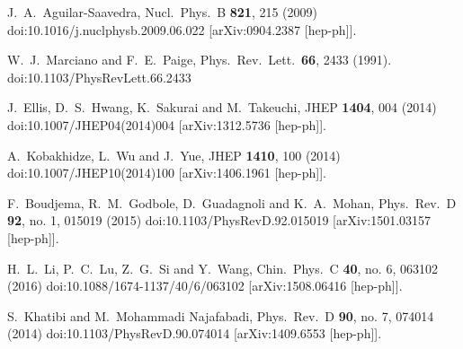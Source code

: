 \documentclass[twocolumn,prd,noshowpacs,nofootinbib,amsmath,amssymb,superscriptaddress,preprintnumbers]{revtex4}
\begin{document}
\begin{thebibliography}{99}
  J.~A.~Aguilar-Saavedra,
  Nucl.\ Phys.\ B {\bf 821}, 215 (2009)
  doi:10.1016/j.nuclphysb.2009.06.022
  [arXiv:0904.2387 [hep-ph]].


  W.~J.~Marciano and F.~E.~Paige,
  Phys.\ Rev.\ Lett.\  {\bf 66}, 2433 (1991).
  doi:10.1103/PhysRevLett.66.2433


  J.~Ellis, D.~S.~Hwang, K.~Sakurai and M.~Takeuchi,
  JHEP {\bf 1404}, 004 (2014)
  doi:10.1007/JHEP04(2014)004
  [arXiv:1312.5736 [hep-ph]].


  A.~Kobakhidze, L.~Wu and J.~Yue,
  JHEP {\bf 1410}, 100 (2014)
  doi:10.1007/JHEP10(2014)100
  [arXiv:1406.1961 [hep-ph]].


  F.~Boudjema, R.~M.~Godbole, D.~Guadagnoli and K.~A.~Mohan,
  Phys.\ Rev.\ D {\bf 92}, no. 1, 015019 (2015)
  doi:10.1103/PhysRevD.92.015019
  [arXiv:1501.03157 [hep-ph]].


  H.~L.~Li, P.~C.~Lu, Z.~G.~Si and Y.~Wang,
  Chin.\ Phys.\ C {\bf 40}, no. 6, 063102 (2016)
  doi:10.1088/1674-1137/40/6/063102
  [arXiv:1508.06416 [hep-ph]].



  S.~Khatibi and M.~Mohammadi Najafabadi,
  Phys.\ Rev.\ D {\bf 90}, no. 7, 074014 (2014)
  doi:10.1103/PhysRevD.90.074014
  [arXiv:1409.6553 [hep-ph]].



\end{thebibliography}
\end{document}

